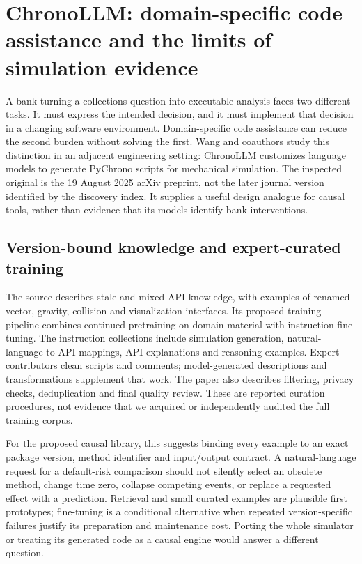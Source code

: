 \section{ChronoLLM: domain-specific code assistance and the limits of simulation evidence}
\label{sec:exec24-chronollm}
A bank turning a collections question into executable analysis faces two
different tasks. It must express the intended decision, and it must implement
that decision in a changing software environment. Domain-specific code
assistance can reduce the second burden without solving the first. Wang and
coauthors study this distinction in an adjacent engineering setting:
ChronoLLM customizes language models to generate PyChrono scripts for
mechanical simulation. The inspected original is the 19 August 2025 arXiv
preprint, not the later journal version identified by the discovery index.
It supplies a useful design analogue for causal tools, rather than evidence
that its models identify bank interventions.\citep{exec24_chronollm_original}

\subsection{Version-bound knowledge and expert-curated training}
The source describes stale and mixed API knowledge, with examples of renamed
vector, gravity, collision and visualization interfaces. Its proposed training
pipeline combines continued pretraining on domain material with instruction
fine-tuning. The instruction collections include simulation generation,
natural-language-to-API mappings, API explanations and reasoning examples.
Expert contributors clean scripts and comments; model-generated descriptions
and transformations supplement that work. The paper also describes filtering,
privacy checks, deduplication and final quality review. These are reported
curation procedures, not evidence that we acquired or independently audited
the full training corpus.\citep{exec24_chronollm_original}

For the proposed causal library, this suggests binding every example to an
exact package version, method identifier and input/output contract. A
natural-language request for a default-risk comparison should not silently
select an obsolete method, change time zero, collapse competing events, or
replace a requested effect with a prediction. Retrieval and small curated
examples are plausible first prototypes; fine-tuning is a conditional
alternative when repeated version-specific failures justify its preparation
and maintenance cost. Porting the whole simulator or treating its generated
code as a causal engine would answer a different question.

